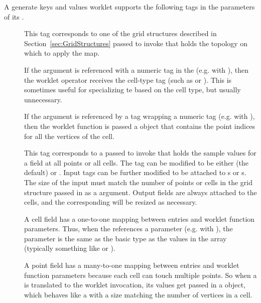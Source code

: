 A generate keys and values worklet supports the following tags in the
parameters of its \controlsignature.
\begin{description}
\item[] This tag corresponds to one of the grid structures
  described in Section~\ref{sec:GridStructures} passed to invoke that holds
  the topology on which to apply the map.

  If the  argument is referenced with a numeric tag in the
  \executionsignature (e.g. with ), then the worklet operator
  receives the cell-type tag (such as  or
  ). This is sometimes useful for specializing te  based
  on the cell type, but usually unnecessary.

  If the  argument is referenced by a 
  tag wrapping a numeric tag (e.g. with ), then
  the worklet function is passed a  object that
  contains the point indices for all the vertices of the cell.
\item[] This tag corresponds to a 
  passed to invoke that holds the sample values for a field at all points
  or all cells. The  tag can be modified to be either
   (the default) or . Input  tags can
  be further modified to be attached to s or
  s. The size of the input  must match
  the number of points or cells in the grid structure passed in as a
   argument.  Output fields are always attached to the
  cells, and the corresponding  will be resized as
  necessary.

  A cell field has a one-to-one mapping between 
  entries and worklet function parameters. Thus, when the
  \executionsignature references a \controlsignature {}
  parameter (e.g. with ), the parameter is the same as the
  basic type as the values in the array (typically something like
   or ).

  A point field has a many-to-one mapping between 
  entries and worklet function parameters because each cell can touch
  multiple points. So when a  is translated to the
  worklet invocation, its values get passed in a 
  object, which behaves like a  with a size matching the number
  of vertices in a cell.
\end{description}

